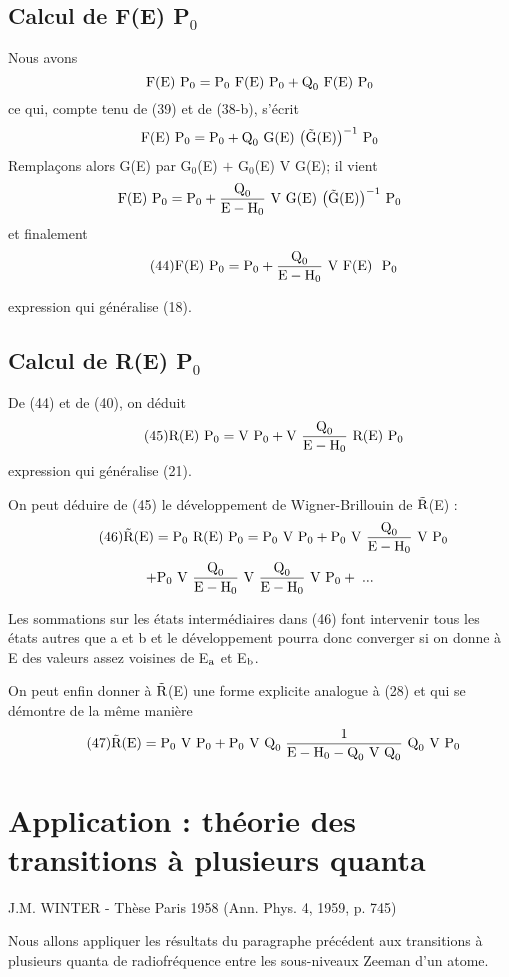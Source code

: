\subsection{Calcul de F(E) P$_0$}%
Nous avons
\[
\text{F(E) }\text{P}_0=\text{P}_0\text{ F(E) }\text{P}_0+\text{Q}_0\text{ F(E) }\text{P}_0
\]
ce qui, compte tenu de (39) et de (38-b), s'écrit
\[
\text{F(E) }\text{P}_0=\text{P}_0+\text{Q}_0\text{ G(E) }\big(\tilde{\text{G}}\text{(E)}\big)^{-1}\text{ P}_0
\]
Remplaçons alors G(E) par G$_0$(E) $+$ G$_0$(E) V G(E); il vient
\[
\text{F(E) }\text{P}_0=\text{P}_0+\frac{\text{Q}_0}{\text{E}-\text{H}_0}\text{ V G(E) }\big(\tilde{\text{G}}\text{(E)}\big)^{-1}\text{ P}_0
\]
et finalement
\[
\tag{44}\text{F(E) }\text{P}_0=\text{P}_0+\frac{\text{Q}_0}{\text{E}-\text{H}_0}\text{ V F(E) }\text{ P}_0
\]

expression qui généralise (18).
\subsection{Calcul de R(E) P$_0$}%
De (44) et de (40), on déduit
\[
\tag{45}\text{R(E) }\text{P}_0=\text{V P}_0+\text{V }\frac{\text{Q}_0}{\text{E}-\text{H}_0}\text{ R(E) }\text{P}_0
\]
expression qui généralise (21).

On peut déduire de (45) le développement de Wigner-Brillouin de $\tilde{\text{R}}$(E) :
\[
\tag{46}\tilde{\text{R}}\text{(E)}=\text{P}_0\text{ R(E) }\text{P}_0=\text{P}_0\text{ V }\text{P}_0+\text{P}_0\text{ V }
\frac{\text{Q}_0}{\text{E}-\text{H}_0}\text{ V }\text{P}_0
\]
\[
+\text{P}_0\text{ V }\frac{\text{Q}_0}{\text{E}-\text{H}_0}\text{ V }
\frac{\text{Q}_0}{\text{E}-\text{H}_0}\text{ V }\text{P}_0+\;...
\]

Les sommations sur les états intermédiaires dans (46) font intervenir tous les
états autres que a et b et le développement pourra donc converger si on donne
à E des valeurs assez voisines de E$_{\text{a}}$ et E$_{\text{b}}$.

On peut enfin donner à $\tilde{\text{R}}$(E) une forme explicite analogue à (28) et qui
se démontre de la même manière
\[
\tag{47}\tilde{\text{R}}\text{(E)}=\text{P}_0\text{ V }\text{P}_0+\text{P}_0\text{ V }\text{Q}_0\;
\frac{1}{\text{E}-\text{H}_0-\text{Q}_0\text{ V }\text{Q}_0}\text{ Q}_0\text{ V }\text{P}_0
\]
\section{Application : théorie des transitions à plusieurs quanta}%
\begin{flushright}
J.M. WINTER - Thèse Paris 1958 (Ann. Phys. 4, 1959, p. 745)
\end{flushright}
Nous allons appliquer les résultats du paragraphe précédent aux
transitions à plusieurs quanta de radiofréquence entre les sous-niveaux
Zeeman d'un atome.
